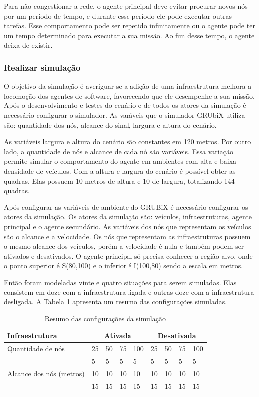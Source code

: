 Para não congestionar a rede, o agente principal deve evitar procurar novos nós por um período de tempo, e durante esse período ele pode executar outras tarefas. Esse comportamento pode ser repetido infinitamente ou o agente pode ter um tempo determinado para executar a sua missão. Ao fim desse tempo, o agente deixa de existir.

\subsubsection{Realizar simulação}

O objetivo da simulação é averiguar se a adição de uma infraestrutura melhora a locomoção dos agentes de software, favorecendo que ele desempenhe a sua missão. Após o desenvolvimento e testes do cenário e de todos os atores da simulação é necessário configurar o simulador. As varáveis que o simulador GRUbiX utiliza são: quantidade dos nós, alcance do sinal, largura e altura do cenário. 

As variáveis largura e altura do cenário são constantes em 120 metros. Por outro lado, a quantidade de nós e alcance de cada nó são variáveis. Essa variação permite simular o comportamento do agente em ambientes com alta e baixa densidade de veículos. Com a altura e largura do cenário é possível obter as quadras. Elas possuem 10 metros de altura e 10 de largura, totalizando 144 quadras.

Após configurar as variáveis de ambiente do GRUBiX é necessário configurar os atores da simulação. Os atores da simulação são: veículos, infraestruturas, agente principal e o agente secundário. As variáveis dos nós que representam os veículos são o alcance e a velocidade. Os nós que representam as infraestruturas possuem o mesmo alcance dos veículos, porém a velocidade é nula e também podem ser ativados e desativados. O agente principal só precisa conhecer a região alvo, onde o ponto superior é S(80,100) e o inferior é I(100,80) sendo a escala em metros.  

Então foram modeladas vinte e quatro situações para serem simuladas. Elas consistem em doze com a infraestrutura ligada e outras doze com a infraestrutura desligada. A Tabela \ref{tab:resumoConfiguracaoSimulacao} apresenta um resumo das configurações simuladas. 

\begin{table}[ht]
	\caption{Resumo das configurações da simulação}
	\centering
	\begin{tabular}{| l | l | l | l | l | l | l | l | l |}
		\hline
		Infraestrutura & \multicolumn{4}{|c|}{Ativada} & \multicolumn{4}{|c|}{Desativada} \\ \hline
		Quantidade de nós & 25 & 50 & 75 & 100 & 25 & 50 & 75 & 100 \\ \hline
		\multirow{3}{*}{Alcance dos nós (metros)} & 5 & 5 & 5 & 5 & 5 & 5 & 5 & 5 \\
		& 10 & 10 & 10 & 10 & 10 & 10 & 10 & 10 \\
		& 15 & 15 & 15 & 15 & 15 & 15 & 15 & 15 \\
		\hline 
	\end{tabular}
	\label{tab:resumoConfiguracaoSimulacao}
\end{table}

